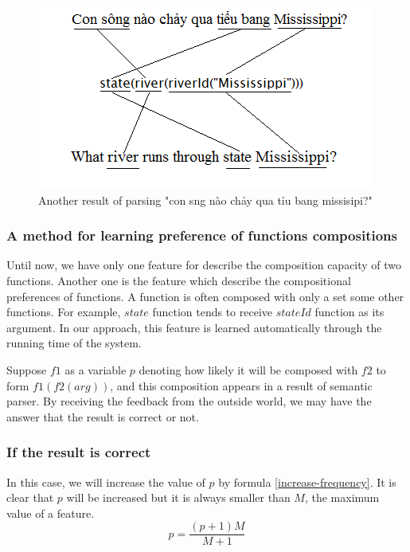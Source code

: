 \begin{figure}[ht!]
\centering
\includegraphics[scale=0.7]{eg-function-function-mapping2.png}
\caption{Another result of parsing "{\selectfont con s\ocircumflex ng n\`ao ch\h{a}y qua ti\h\ecircumflex u bang missisipi?}"}
\label{f-f.eg2}
\end{figure}

\subsubsection{A method for learning preference of functions compositions}
Until now, we have only one feature for describe the composition capacity of two functions. Another one is the feature which describe the compositional preferences of functions. A function is often composed with only a set some other functions. For example, $state$ function tends to receive $stateId$ function as its argument. In our approach, this feature is learned automatically through the running time of the system. 

Suppose $f1$ as a variable $p$ denoting how likely it will be composed with $f2$ to form $f1(f2(arg))$, and this composition appears in a result of semantic parser. By receiving the feedback from the outside world, we may have the answer that the result is correct or not.
\subsubsection*{If the result is correct}
In this case, we will increase the value of $p$ by formula \ref{increase-frequency}. It is clear that $p$ will be increased but it is always smaller than $M$, the maximum value of a feature.
\begin{equation}
\label{increase-frequency}
p = \frac{(p + 1)M}{M+1}
\end{equation}

